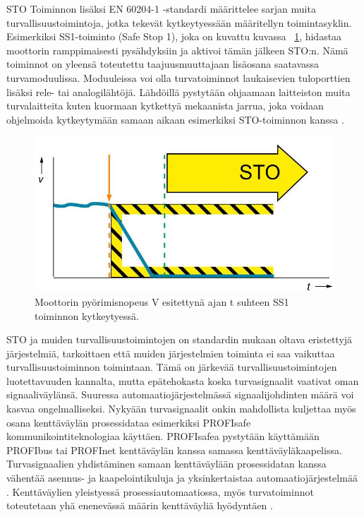 \documentclass[finnish,12pt,a4paper,pdftex,elec,utf8]{aaltothesis}
\begin{document}
\noindent
STO Toiminnon lisäksi EN 60204-1 -standardi määrittelee sarjan muita turvallisuustoimintoja, jotka tekevät kytkeytyessään määritellyn toimintasyklin. Esimerkiksi SS1-toiminto (Safe Stop 1), joka on kuvattu kuvassa ~\ref{fig:SS1}, hidastaa moottorin ramppimaisesti pysähdyksiin ja aktivoi tämän jälkeen STO:n. Nämä toiminnot on yleensä toteutettu taajuusmuuttajaan lisäosana saatavassa turvamoduulissa. Moduuleissa voi olla turvatoiminnot laukaisevien tuloporttien lisäksi rele- tai analogilähtöjä. Lähdöillä pystytään ohjaamaan laitteiston muita turvalaitteita kuten kuormaan kytkettyä mekaanista jarrua, joka voidaan ohjelmoida kytkeytymään samaan aikaan esimerkiksi STO-toiminnon kanssa \cite{FSO}.

\begin{figure}[H]
	\begin{center}
	\includegraphics[scale=0.5]{SS1}
	\end{center}
	\caption{Moottorin pyörimisnopeus V esitettynä ajan t suhteen SS1 toiminnon kytkeytyessä.
		 \cite{SS1kuva}}
	\label{fig:SS1}
\end{figure}

\noindent
STO ja muiden turvallisuustoimintojen on standardin mukaan oltava eristettyjä järjestelmiä, tarkoittaen että muiden järjestelmien toiminta ei saa vaikuttaa turvallisuustoiminnon toimintaan. Tämä on järkevää turvallisuustoimintojen luotettavuuden kannalta, mutta epätehokasta koska turvasignaalit vaativat oman signaaliväylänsä. Suuressa automaatiojärjestelmässä signaalijohdinten määrä voi kasvaa ongelmalliseksi. Nykyään turvasignaalit onkin mahdollista kuljettaa myös osana kenttäväylän prosessidataa esimerkiksi PROFIsafe kommunikointiteknologiaa käyttäen. PROFIsafea pystytään käyttämään PROFIbus tai PROFInet kenttäväylän kanssa samassa kenttäväyläkaapelissa. Turvasignaalien yhdistäminen samaan kenttäväylään prosessidatan kanssa vähentää asennus- ja kaapelointikuluja ja yksinkertaistaa automaatiojärjestelmää \cite{MyyntiHaastattelu}. Kenttäväylien yleistyessä prosessiautomaatiossa, myös turvatoiminnot toteutetaan yhä enenevässä määrin kenttäväyliä hyödyntäen \cite{Profisafe}.
\\\\
\end{document}
